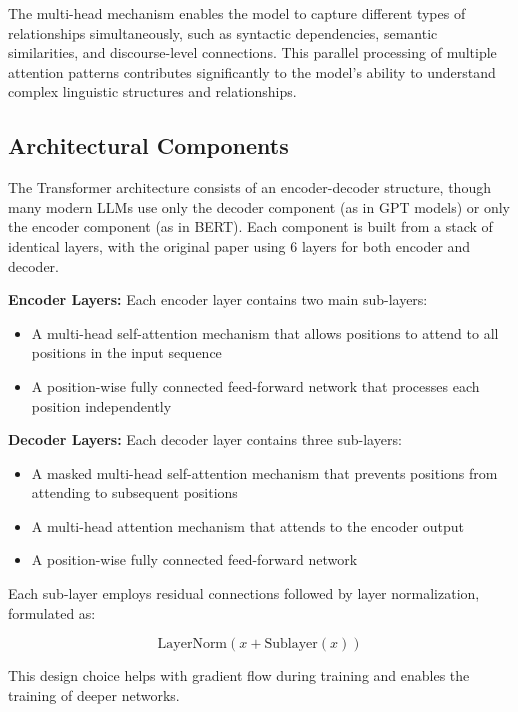 The multi-head mechanism enables the model to capture different types of relationships simultaneously, such as syntactic dependencies, semantic similarities, and discourse-level connections. This parallel processing of multiple attention patterns contributes significantly to the model's ability to understand complex linguistic structures and relationships.

\subsection{Architectural Components}

The Transformer architecture consists of an encoder-decoder structure, though many modern LLMs use only the decoder component (as in GPT models) or only the encoder component (as in BERT). Each component is built from a stack of identical layers, with the original paper using 6 layers for both encoder and decoder.

\textbf{Encoder Layers:} Each encoder layer contains two main sub-layers:
\begin{itemize}
    \item A multi-head self-attention mechanism that allows positions to attend to all positions in the input sequence
    \item A position-wise fully connected feed-forward network that processes each position independently
\end{itemize}

\textbf{Decoder Layers:} Each decoder layer contains three sub-layers:
\begin{itemize}
    \item A masked multi-head self-attention mechanism that prevents positions from attending to subsequent positions
    \item A multi-head attention mechanism that attends to the encoder output
    \item A position-wise fully connected feed-forward network
\end{itemize}

Each sub-layer employs residual connections followed by layer normalization, formulated as:

\begin{equation}
\text{LayerNorm}(x + \text{Sublayer}(x))
\end{equation}

This design choice helps with gradient flow during training and enables the training of deeper networks.

